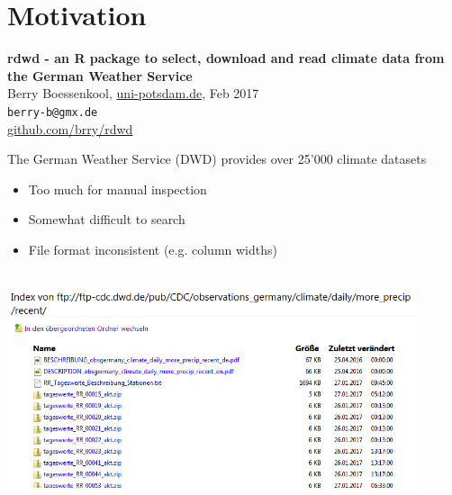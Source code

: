 \documentclass[compress, xcolor=dvipsnames]{beamer}\usepackage[]{graphicx}\usepackage[]{color}
\begin{document}
\centering



\section{Motivation}





\begin{frame}%
\vspace{1em}
\Large
\textbf{rdwd - an R package to select, download and read climate data from the German Weather Service}\\[2em]
\normalsize
Berry Boessenkool, \href{http://www.geo.uni-potsdam.de/geoecology.html}{uni-potsdam.de}, Feb 2017\\[1em]
\texttt{berry-b@gmx.de}\\[1em]
\href{https://github.com/brry/rdwd\#rdwd}{github.com/brry/rdwd}
\end{frame}


\begin{frame}{The German Weather Service (DWD) provides over 25'000 climate datasets}
\pause
\begin{itemize}%
\item Too much for manual inspection
\item Somewhat difficult to search
\item File format inconsistent (e.g. column widths)
\end{itemize}
\pause
{}\\[0.5em]
\includegraphics[width=0.9\textwidth]{dwd_ftp.PNG}\\
\end{frame}
\end{document}
